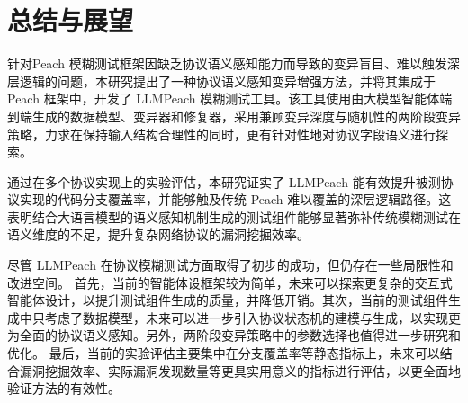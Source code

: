 \chapter{总结与展望}

针对Peach 模糊测试框架因缺乏协议语义感知能力而导致的变异盲目、难以触发深层逻辑的问题，本研究提出了一种协议语义感知变异增强方法，并将其集成于 Peach 框架中，开发了 LLMPeach 模糊测试工具。该工具使用由大模型智能体端到端生成的数据模型、变异器和修复器，采用兼顾变异深度与随机性的两阶段变异策略，力求在保持输入结构合理性的同时，更有针对性地对协议字段语义进行探索。

通过在多个协议实现上的实验评估，本研究证实了 LLMPeach 能有效提升被测协议实现的代码分支覆盖率，并能够触及传统 Peach 难以覆盖的深层逻辑路径。这表明结合大语言模型的语义感知机制生成的测试组件能够显著弥补传统模糊测试在语义维度的不足，提升复杂网络协议的漏洞挖掘效率。

尽管 LLMPeach 在协议模糊测试方面取得了初步的成功，但仍存在一些局限性和改进空间。
首先，当前的智能体设框架较为简单，未来可以探索更复杂的交互式智能体设计，以提升测试组件生成的质量，并降低开销。其次，当前的测试组件生成中只考虑了数据模型，未来可以进一步引入协议状态机的建模与生成，以实现更为全面的协议语义感知。另外，两阶段变异策略中的参数选择也值得进一步研究和优化。
最后，当前的实验评估主要集中在分支覆盖率等静态指标上，未来可以结合漏洞挖掘效率、实际漏洞发现数量等更具实用意义的指标进行评估，以更全面地验证方法的有效性。